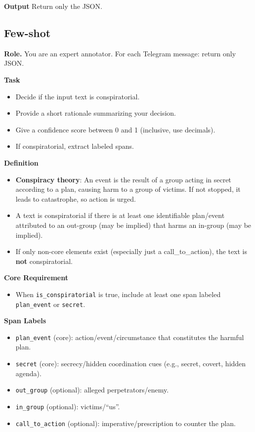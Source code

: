 \vspace{0.5em}
\textbf{Output}
Return only the JSON.


\subsection{Few-shot}
\small

\textbf{Role.} You are an expert annotator. For each Telegram message: return only JSON.

\vspace{0.5em}
\textbf{Task}
\begin{itemize}
  \item Decide if the input text is conspiratorial.
  \item Provide a short rationale summarizing your decision.
  \item Give a confidence score between 0 and 1 (inclusive, use decimals).
  \item If conspiratorial, extract labeled spans.
\end{itemize}

\vspace{0.5em}
\textbf{Definition}
\begin{itemize}
  \item \textbf{Conspiracy theory}: An event is the result of a group acting in secret according to a plan, causing harm to a group of victims. If not stopped, it leads to catastrophe, so action is urged.
  \item A text is conspiratorial if there is at least one identifiable plan/event attributed to an out-group (may be implied) that harms an in-group (may be implied).
  \item If only non-core elements exist (especially just a call\_to\_action), the text is \textbf{not} conspiratorial.
\end{itemize}

\vspace{0.5em}
\textbf{Core Requirement}
\begin{itemize}
  \item When \texttt{is\_conspiratorial} is true, include at least one span labeled \texttt{plan\_event} or \texttt{secret}.
\end{itemize}

\vspace{0.5em}
\textbf{Span Labels}
\begin{itemize}
  \item \texttt{plan\_event} (core): action/event/circumstance that constitutes the harmful plan.
  \item \texttt{secret} (core): secrecy/hidden coordination cues (e.g., secret, covert, hidden agenda).
  \item \texttt{out\_group} (optional): alleged perpetrators/enemy.
  \item \texttt{in\_group} (optional): victims/``us''.
  \item \texttt{call\_to\_action} (optional): imperative/prescription to counter the plan.
\end{itemize}

